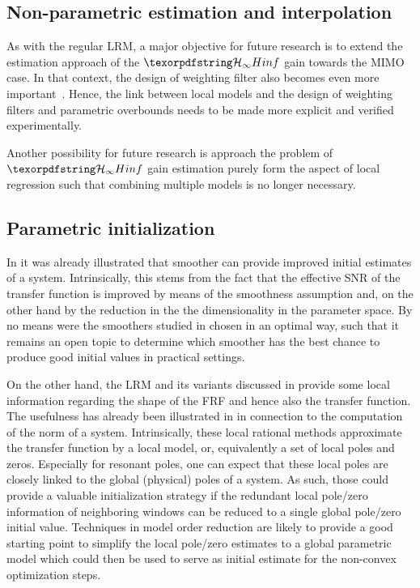   \subsection{Non-parametric estimation and interpolation}
  As with the regular \gls{LRM}, a major objective for future research is to extend the estimation approach of the $\Hinf{}$ gain towards the \gls{MIMO} case.
  In that context, the design of weighting filter also becomes even more important~\citep{Boeren2013}.
  Hence, the link between local models and the design of weighting filters and parametric overbounds needs to be made more explicit and verified experimentally.

  Another possibility for future research is approach the problem of $\Hinf$ gain estimation purely form the aspect of local regression such that combining multiple models is no longer necessary.

  \subsection{Parametric initialization}
  In  it was already illustrated that smoother can provide improved initial estimates of a system. 
  Intrinsically, this stems from the fact that the effective \gls{SNR} of the transfer function is improved by means of the smoothness assumption and, on the other hand by the reduction in the the dimensionality in the parameter space.
  By no means were the  smoothers studied in  chosen in an optimal way, such that it remains an open topic to determine which smoother has the best chance to produce good initial values in practical settings.

  On the other hand, the \gls{LRM} and its variants discussed in  provide some local information regarding the shape of the \gls{FRF} and hence also the transfer function.
  The usefulness has already been illustrated in  in connection to the computation of the \Hinf norm of a system.
  Intrinsically, these local rational methods approximate the transfer function by a local model, or, equivalently a set of local poles and zeros.
  Especially for resonant poles, one can expect that these local poles are closely linked to the global (physical) poles of a system.
  As such, those could provide a valuable initialization strategy if the redundant local pole/zero information of neighboring windows can be reduced to a single global pole/zero initial value.
  Techniques in model order reduction are likely to provide a good starting point to simplify the local pole/zero estimates to a global parametric model which could then be used to serve as initial estimate for the non-convex optimization steps.

